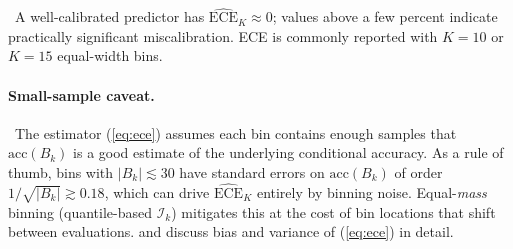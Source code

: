 \Cons\ A well-calibrated predictor has
$\widehat{\mathrm{ECE}}_K \approx 0$; values above a few percent
indicate practically significant miscalibration. ECE is commonly
reported with $K = 10$ or $K = 15$ equal-width bins.

\paragraph{Small-sample caveat.}
\Assum\ The estimator (\ref{eq:ece}) assumes each bin contains enough
samples that $\mathrm{acc}(B_k)$ is a good estimate of the underlying
conditional accuracy. As a rule of thumb, bins with $|B_k| \lesssim 30$
have standard errors on $\mathrm{acc}(B_k)$ of order
$1/\sqrt{|B_k|} \gtrsim 0.18$, which can drive $\widehat{\mathrm{ECE}}_K$
entirely by binning noise. Equal-\emph{mass} binning (quantile-based
$\mathcal{I}_k$) mitigates this at the cost of bin locations that shift
between evaluations. \citet{kumar2019ece} and \citet{nixon2019measuring}
discuss bias and variance of (\ref{eq:ece}) in detail.

